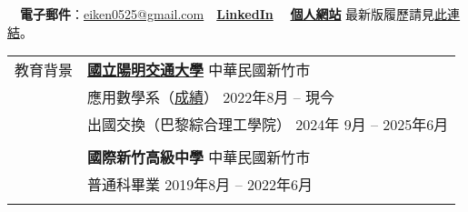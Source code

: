 \documentclass[letterpaper, 11pt]{article}
\begin{document}
\begin{CJK*}{UTF8}{bsmi}


\vspace{0.5cm} 
\noindent\:\ \ \:\!\:\!\textbf{電子郵件}：\href{mailto:eiken0525@gmail.com}{eiken0525@gmail.com}\qquad \ \ 
\href{https://www.linkedin.com/in/eiken59}{\textbf{LinkedIn}} 
\qquad \ \ 
\href{https://eiken59.github.io}{\textbf{個人網站}} \hfill{\footnotesize 最新版履歷請見\href{https://github.com/eiken59/CV/blob/main/eiken59_CV_chinese.pdf}{此連結}。\ \ \ \,}


\setlength{\tabcolsep}{8pt}
\vspace{-1.5em}
\begin{center}
    \begin{longtable}{p{0.72in}p{5.97in}}

        
        
        
        \textcolor{OliveGreen}{教育背景} 
        & \href{https://www.nycu.edu.tw/nycu/en/index}{\textbf{國立陽明交通大學}} \hfill 中華民國新竹市 \\ 
        & 應用數學系（\href{https://docs.google.com/spreadsheets/d/1hz9FwNdFio4EajAw5VN3lpa6QyxIE2GJ6FpHmMoSaaQ/edit?usp=sharing}{成績}） \hfill 2022年8月 -- 現今 \\
        & 出國交換（巴黎綜合理工學院） \hfill 2024年 9月 -- 2025年6月\\
        & \\
        
        & \textbf{國際新竹高級中學} \hfill 中華民國新竹市 \\
        & 普通科畢業 \hfill 2019年8月 -- 2022年6月\\
        & \\
        
        

\end{longtable}
\end{center}
\end{CJK*}
\end{document}
